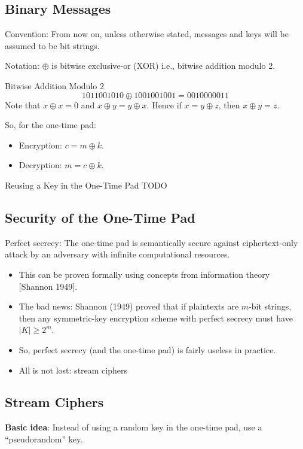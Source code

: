 \subsection*{Binary Messages}
Convention: From now on, unless otherwise stated, messages and keys will be assumed
to be bit strings.

\begin{Remark}{}{}
      Notation: $\oplus$ is bitwise exclusive-or (XOR)
      i.e., bitwise addition modulo 2.
\end{Remark}

\begin{Example}{Bitwise Addition Modulo 2}{}
      \[ 1011001010 \oplus 1001001001=0010000011 \]
      Note that $x \oplus x=0$ and $x \oplus y=y \oplus x$.
      Hence if $x=y \oplus z$, then $x \oplus y=z$.
\end{Example}
So, for the one-time pad:
\begin{itemize}
      \item Encryption: $c=m \oplus k$.
      \item Decryption: $m=c \oplus k$.
\end{itemize}

\begin{Example}{Reusing a Key in the One-Time Pad}{}
      TODO
\end{Example}

\subsection*{Security of the One-Time Pad}
Perfect secrecy: The one-time pad is semantically
secure against ciphertext-only attack by an adversary
with infinite computational resources.

\begin{itemize}
      \item This can be proven formally using concepts from information theory [Shannon 1949$]$.
      \item The bad news: Shannon (1949) proved that if plaintexts are $m$-bit strings,
            then any symmetric-key encryption scheme with perfect secrecy
            must have $|K| \geq 2^{m}$.
      \item So, perfect secrecy (and the one-time pad) is fairly useless in practice.
      \item All is not lost: stream ciphers
\end{itemize}

\subsection*{Stream Ciphers}
\textbf{Basic idea}: Instead of using a random key
in the one-time pad, use a ``pseudorandom'' key.

